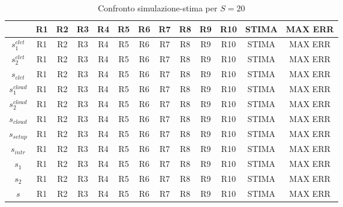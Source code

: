 
\begin{table}[!h]
\begin{tabular}{c|c|c|c|c|c|c|c|c|c|c|c|c}
                & R1 & R2 & R3 & R4 & R5 & R6 & R7 & R8 & R9 & R10 & STIMA & MAX ERR \\
                \hline
$s_1^{clet}$  & R1 & R2 & R3 & R4 & R5 & R6 & R7 & R8 & R9 & R10 & STIMA & MAX ERR \\
$s_2^{clet}$  & R1 & R2 & R3 & R4 & R5 & R6 & R7 & R8 & R9 & R10 & STIMA & MAX ERR \\
$s_{clet}$    & R1 & R2 & R3 & R4 & R5 & R6 & R7 & R8 & R9 & R10 & STIMA & MAX ERR \\
$s_1^{cloud}$ & R1 & R2 & R3 & R4 & R5 & R6 & R7 & R8 & R9 & R10 & STIMA & MAX ERR \\
$s_2^{cloud}$ & R1 & R2 & R3 & R4 & R5 & R6 & R7 & R8 & R9 & R10 & STIMA & MAX ERR \\
$s_{cloud}$   & R1 & R2 & R3 & R4 & R5 & R6 & R7 & R8 & R9 & R10 & STIMA & MAX ERR \\
$s_{setup}$   & R1 & R2 & R3 & R4 & R5 & R6 & R7 & R8 & R9 & R10 & STIMA & MAX ERR \\
$s_{intr}$    & R1 & R2 & R3 & R4 & R5 & R6 & R7 & R8 & R9 & R10 & STIMA & MAX ERR \\
$s_1$         & R1 & R2 & R3 & R4 & R5 & R6 & R7 & R8 & R9 & R10 & STIMA & MAX ERR \\
$s_2$         & R1 & R2 & R3 & R4 & R5 & R6 & R7 & R8 & R9 & R10 & STIMA & MAX ERR \\
$s$           & R1 & R2 & R3 & R4 & R5 & R6 & R7 & R8 & R9 & R10 & STIMA & MAX ERR \\
\end{tabular}
\centering
\caption{Confronto simulazione-stima per $S=20$}
\label{srv_20}
\end{table}
